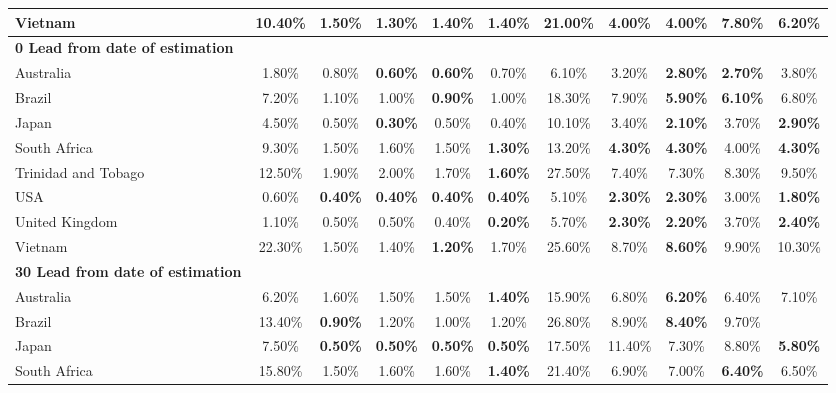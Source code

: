 \begin{table}[!ht]
\begin{adjustbox}{max width=\textwidth}
\begin{tabular}{|l|c|c|c|c|c|c|c|c|c|c|}
        Vietnam & 10.40\% & 1.50\% & \textbf{1.30\%} & 1.40\% & 1.40\% & 21.00\% & \textbf{4.00\%} & \textbf{4.00\%} & 7.80\% & 6.20\% \\ \hline
        \textbf{0 Lead from date of estimation}& ~ & ~ & ~ & ~ & ~ & ~ & ~ & ~ & ~ & ~ \\ \hline
        Australia & 1.80\% & 0.80\% & \textbf{0.60\%} & \textbf{0.60\%} & 0.70\% & 6.10\% & 3.20\% & \textbf{2.80\%} & \textbf{2.70\%} & 3.80\% \\ \hline
        Brazil & 7.20\% & 1.10\% & 1.00\% & \textbf{0.90\%} & 1.00\% & 18.30\% & 7.90\% & \textbf{5.90\%} & \textbf{6.10\%} & 6.80\% \\ \hline
        Japan & 4.50\% & 0.50\% & \textbf{0.30\%} & 0.50\% & 0.40\% & 10.10\% & 3.40\% & \textbf{2.10\%} & 3.70\% & \textbf{2.90\%} \\ \hline
        South Africa & 9.30\% & 1.50\% & 1.60\% & 1.50\% & \textbf{1.30\%} & 13.20\% & \textbf{4.30\%} & \textbf{4.30\%} & 4.00\% & \textbf{4.30\%} \\ \hline
        Trinidad and Tobago & 12.50\% & 1.90\% & 2.00\% & 1.70\% & \textbf{1.60\%} & 27.50\% & 7.40\% & 7.30\% & 8.30\% & 9.50\% \\ \hline
        USA & 0.60\% & \textbf{0.40\%} & \textbf{0.40\%} & \textbf{0.40\%} & \textbf{0.40\%} & 5.10\% & \textbf{2.30\%} & \textbf{2.30\%} & 3.00\% & \textbf{1.80\%} \\ \hline
        United Kingdom & 1.10\% & 0.50\% & 0.50\% & 0.40\% & \textbf{0.20\%} & 5.70\% & \textbf{2.30\%} & \textbf{2.20\%} & 3.70\% & \textbf{2.40\%} \\ \hline
        Vietnam & 22.30\% & 1.50\% & 1.40\% & \textbf{1.20\%} & 1.70\% & 25.60\% & 8.70\% & \textbf{8.60\%} & 9.90\% & 10.30\% \\ \hline
		\textbf{30 Lead from date of estimation} & ~ & ~ & ~ & ~ & ~ & ~ & ~ & ~ & ~ & ~ \\ \hline
        Australia & 6.20\% & 1.60\% & 1.50\% & 1.50\% & \textbf{1.40\%} & 15.90\% & 6.80\% & \textbf{6.20\%} & 6.40\% & 7.10\% \\ \hline
        Brazil & 13.40\% & \textbf{0.90\%} & 1.20\% & 1.00\% & 1.20\% & 26.80\% & 8.90\% & \textbf{8.40\%} & 9.70\% \\ \hline
        Japan & 7.50\% & \textbf{0.50\%} & \textbf{0.50\%} & \textbf{0.50\%} & \textbf{0.50\%} & 17.50\% & 11.40\% & 7.30\% & 8.80\% & \textbf{5.80\%} \\ \hline
        South Africa & 15.80\% & 1.50\% & 1.60\% & 1.60\% & \textbf{1.40\%} & 21.40\% & 6.90\% & 7.00\% & \textbf{6.40\%} & 6.50\% \\ \hline

\end{tabular}
\end{adjustbox}
\end{table}
